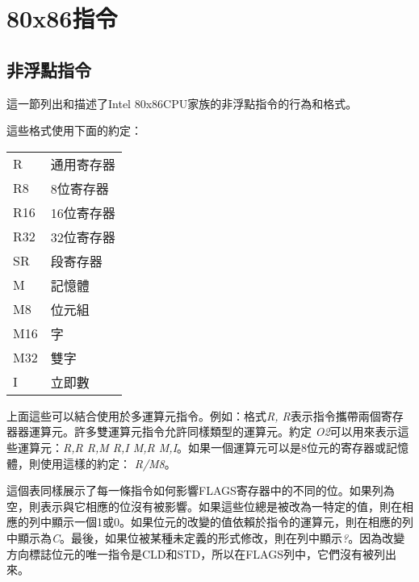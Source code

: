 \chapter{80x86指令}
\section{非浮點指令}
這一節列出和描述了Intel 80x86CPU家族的非浮點指令的行為和格式。

這些格式使用下面的約定：
\begin{center}
\begin{tabular}{|l|l|}
\hline
R   & 通用寄存器 \\
R8  & 8位寄存器 \\
R16 & 16位寄存器 \\
R32 & 32位寄存器 \\
SR  & 段寄存器 \\
M   & 記憶體 \\
M8  & 位元組 \\
M16 & 字 \\
M32 & 雙字 \\
I   & 立即數 \\
\hline
\end{tabular}
\end{center}
上面這些可以結合使用於多運算元指令。例如：格式\emph{R, R}表示指令攜帶兩個寄存器器運算元。許多雙運算元指令允許同樣類型的運算元。約定
\emph{O2}可以用來表示這些運算元：\emph{R,R R,M R,I M,R M,I}。如果一個運算元可以是8位元的寄存器或記憶體，則使用這樣的約定：
\emph{R/M8}。

這個表同樣展示了每一條指令如何影響FLAGS寄存器中的不同的位。如果列為空，則表示與它相應的位沒有被影響。如果這些位總是被改為一特定的值，則在相應的列中顯示一個1或0。如果位元的改變的值依賴於指令的運算元，則在相應的列中顯示為\emph{C}。最後，如果位被某種未定義的形式修改，則在列中顯示\emph{?}。因為改變方向標誌位元的唯一指令是{\code CLD}和{\code STD}，所以在FLAGS列中，它們沒有被列出來。

